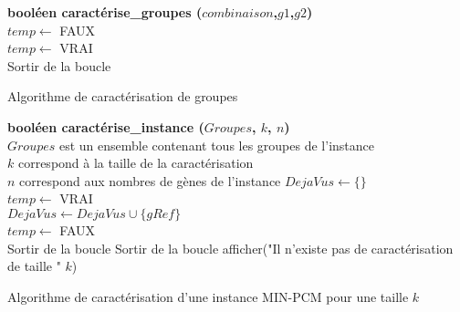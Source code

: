 \documentclass[a4paper,10pt]{article}
\begin{document}
%
%
%

\begin{algorithm}[!h]
	\textbf{booléen caractérise\_groupes ($combinaison$,$g1$,$g2$)}\\
	{
		{
			$temp \leftarrow$ FAUX\\
			{
					{
						$temp \leftarrow$ VRAI\\
						Sortir de la boucle
					}
			}
			 {}
		}
	}
	
	\caption{Algorithme de caractérisation de groupes}
\end{algorithm}

\begin{algorithm}[!h]
	\textbf{booléen caractérise\_instance ($Groupes$, $k$, $n$)}\\
	\tcp
	{
		$Groupes$ est un ensemble contenant tous les groupes de l'instance\\
		$k$ correspond à la taille de la caractérisation\\
		$n$ correspond aux nombres de gènes de l'instance
	}	
	{
		$DejaVus \leftarrow \{ \}$\\
		$temp \leftarrow$ VRAI\\
		{
			$DejaVus \leftarrow DejaVus \cup \{gRef\}$\\
			{
					{
					$temp \leftarrow$ FAUX\\
					Sortir de la boucle
					}
			}
			 {Sortir de la boucle}
		}
		 {}
	}
	afficher("Il n'existe pas de caractérisation de taille " $k$)\\
	\caption{Algorithme de caractérisation d'une instance MIN-PCM pour une taille $k$}
\end{algorithm}
\end{document}

